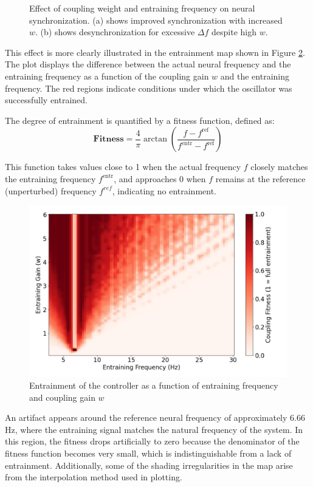 \documentclass{cmc}
\begin{document}
\begin{figure}[H]
\begin{minipage}{0.48\textwidth}
    \label{fig:exercise62b}
  \end{minipage}
  \caption{Effect of coupling weight and entraining frequency on neural synchronization. (a) shows improved synchronization with increased $w$. (b) shows desynchronization for excessive $\Delta f$ despite high $w$.}
  \label{fig:exercise62}
\end{figure}

This effect is more clearly illustrated in the entrainment map shown in Figure \ref{fig:arnold_tongue}. The plot displays the difference between the actual neural frequency and the entraining frequency as a function of the coupling gain $w$ and the entraining frequency. The red regions indicate conditions under which the oscillator was successfully entrained.

The degree of entrainment is quantified by a fitness function, defined as:
\[
\textbf{Fitness} =  \frac{4}{\pi}\arctan\left(\frac{f-f^{\text{ref}}}{f^{\text{entr}}-f^{\text{ref}}}\right)
\]

This function takes values close to 1 when the actual frequency $f$ closely matches the entraining frequency $f^{\text{entr}}$, and approaches 0 when $f$ remains at the reference (unperturbed) frequency $f^{ref}$, indicating no entrainment.
\begin{figure}[H]
    \centering
    \includegraphics[width=0.8\linewidth]{our_figures/exercise8_arnold_tongue_fitness_interpolated.png}
    \caption{Entrainment of the controller as a function of entraining frequency and coupling gain $w$}
    \label{fig:arnold_tongue}
\end{figure}

An artifact appears around the reference neural frequency of approximately 6.66 Hz, where the entraining signal matches the natural frequency of the system. In this region, the fitness drops artificially to zero because the denominator of the fitness function becomes very small, which is indistinguishable from a lack of entrainment. Additionally, some of the shading irregularities in the map arise from the interpolation method used in plotting.
\end{document}
